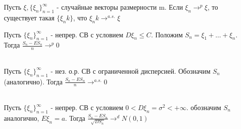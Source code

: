 \documentclass{article}
\begin{document}
	\begin{theorem}
		Пусть $\xi, \{\xi_n\}_{n=1}^{\infty}$ - случайные векторы размерности m. Если $\xi_n \to^p \xi$, то существует такая $\{\xi_nk\}$, что 
		$\xi_nk \to^{a.s.} \xi$
	\end{theorem}
	
	\begin{theorem}[<ЗБЧ>]
		Пусть $\{\xi_n\}_{n=1}^\infty$ - непрер. СВ с условием  $D\xi_n \le C$. Положим $S_n = \xi_1 + \ldots + \xi_n$.
		Тогда $\frac{S_n - ES_n}{n} \to^p 0$\\
	\end{theorem} 
	
	\begin{theorem}[<УЗБЧ>]\\
		Пусть $\{\xi_n\}_{n=1}^\infty$ - нез. о.р. СВ с ограниченной дисперсией. Обозначим $S_n$ (аналогично). 
		Тогда $\frac{S_n - ES_n}{n} \to^{a.s.} 0$\\
	\end{theorem} 
	
	\begin{theorem}\\
		Пусть $\{\xi_n\}_{n=1}^\infty$ - непрер. СВ с условием  $0 < D\xi_n =\sigma^2 < +\infty$. обозначим $S_n$ аналогично, $E\xi_n = a$.
		Тогда $\frac{S_n - ES_n}{\sqrt{DS_n}} \to^d N(0,1)$ 	\\
	\end{theorem} 
	
\end{document}
